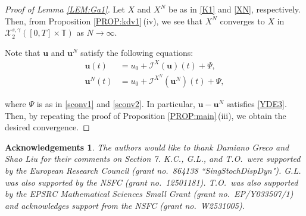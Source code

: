 \documentclass[letterpaper, 11pt,  reqno]{amsart}
\newcommand{\1}{\hspace{0.5mm}\text{I}\hspace{0.5mm}}
\newcommand{\I}{\mathcal{I}}
\newcommand{\noi}{\noindent}
\newcommand{\T}{\mathbb{T}}
\newcommand{\g}{\gamma}
\newcommand{\cX}{\mathcal{X}}
\newcommand{\uu}{\mathbf{u}}
\newtheorem*{ackno}{Acknowledgements}
\numberwithin{equation}{section}
\numberwithin{theorem}{section}
\begin{document}
 
\begin{proof}[Proof of Lemma \ref{LEM:Ga1}]

Let $X$ and $X^N$ be as in 
\eqref{K1} and 
\eqref{XN},   respectively.
Then, 
from Proposition \ref{PROP:kdv1}\,(iv), 
we see that 
$X^N$ converges to  $X$ 
in  $ \cX^{s, \g}_2([0, T]\times \T)$ as $N \to \infty$.

Note that $\uu$ and $\uu^N$ satisfy the following equations:
\begin{align*}
\uu(t) & = u_0 + \I^{X}(\uu)(t) + \Psi, \\
\uu^N(t) & = u_0 + \I^{X^N}(\uu^N)(t) + \Psi, 
\end{align*}

\noi
where $\Psi$ is as in \eqref{sconv1} and \eqref{sconv2}.
In particular, $\uu - \uu^N$ satisfies \eqref{YDE3}.
Then, by repeating the proof of 
Proposition \ref{PROP:main}\,(iii), 
we obtain the desired convergence.
\end{proof}
	









\begin{ackno}\rm
The authors would like to thank Damiano Greco and Shao Liu
for their comments on Section 7.
K.C., G.L., and T.O.~were supported by the European Research Council (grant no.~864138 ``SingStochDispDyn").
G.L. was also supported by the NSFC (grant no.~12501181).
T.O.~was also supported by the EPSRC 
Mathematical Sciences
Small Grant  (grant no.~EP/Y033507/1)
and acknowledges support from  
the NSFC (grant no.~W2531005).


\end{ackno}
\end{document}
